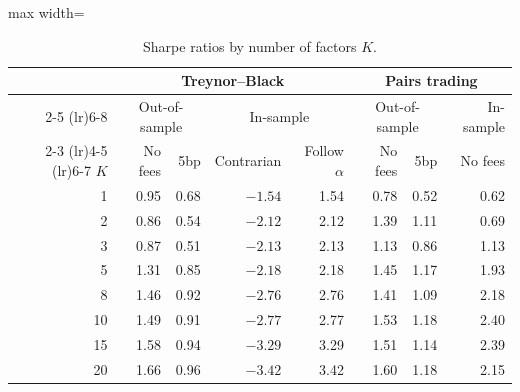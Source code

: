 \documentclass[11pt,letterpaper]{article}
\begin{document}
\begin{table}[!htbp]
\centering
\caption{Sharpe ratios by number of factors $K$.}
\label{tab:k}
\begin{adjustbox}{max width=\linewidth}
\begin{tabular}{rrrrrrrr}
\toprule
& \multicolumn{4}{c}{Treynor--Black} & \multicolumn{3}{c}{Pairs trading} \\
\cmidrule(lr){2-5} \cmidrule(lr){6-8}
& \multicolumn{2}{c}{Out-of-sample} & \multicolumn{2}{c}{In-sample} & \multicolumn{2}{c}{Out-of-sample} & In-sample \\
\cmidrule(lr){2-3} \cmidrule(lr){4-5} \cmidrule(lr){6-7}
$K$ & No fees & 5bp & Contrarian & Follow $\alpha$ & No fees & 5bp & No fees \\
\midrule
1 & 0.95 & 0.68 & $-1.54$ & 1.54 & 0.78 & 0.52 & 0.62 \\
2 & 0.86 & 0.54 & $-2.12$ & 2.12 & 1.39 & 1.11 & 0.69 \\
3 & 0.87 & 0.51 & $-2.13$ & 2.13 & 1.13 & 0.86 & 1.13 \\
5 & 1.31 & 0.85 & $-2.18$ & 2.18 & 1.45 & 1.17 & 1.93 \\
8 & 1.46 & 0.92 & $-2.76$ & 2.76 & 1.41 & 1.09 & 2.18 \\
10 & 1.49 & 0.91 & $-2.77$ & 2.77 & 1.53 & 1.18 & 2.40 \\
15 & 1.58 & 0.94 & $-3.29$ & 3.29 & 1.51 & 1.14 & 2.39 \\
20 & 1.66 & 0.96 & $-3.42$ & 3.42 & 1.60 & 1.18 & 2.15 \\
\bottomrule
\end{tabular}
\end{adjustbox}
\end{table}
\end{document}

